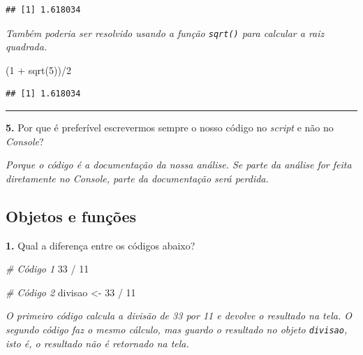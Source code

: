 \documentclass[
]{book}
\newenvironment{Shaded}{\begin{snugshade}}{\end{snugshade}}
\newcommand{\CommentTok}[1]{\textcolor[rgb]{0.56,0.35,0.01}{\textit{#1}}}
\newcommand{\DecValTok}[1]{\textcolor[rgb]{0.00,0.00,0.81}{#1}}
\newcommand{\FunctionTok}[1]{\textcolor[rgb]{0.00,0.00,0.00}{#1}}
\newcommand{\NormalTok}[1]{#1}
\newcommand{\OtherTok}[1]{\textcolor[rgb]{0.56,0.35,0.01}{#1}}
\newcommand{\SpecialCharTok}[1]{\textcolor[rgb]{0.00,0.00,0.00}{#1}}
\begin{document}
\begin{verbatim}
## [1] 1.618034
\end{verbatim}

\emph{Também poderia ser resolvido usando a função \texttt{sqrt()} para calcular a raiz quadrada.}

\begin{Shaded}
\begin{Highlighting}[]
\NormalTok{(}\DecValTok{1} \SpecialCharTok{+} \FunctionTok{sqrt}\NormalTok{(}\DecValTok{5}\NormalTok{))}\SpecialCharTok{/}\DecValTok{2}
\end{Highlighting}
\end{Shaded}

\begin{verbatim}
## [1] 1.618034
\end{verbatim}

\begin{center}\rule{0.5\linewidth}{0.5pt}\end{center}

\textbf{5.} Por que é preferível escrevermos sempre o nosso código no \emph{script} e não no \emph{Console}?

\emph{Porque o código é a documentação da nossa análise. Se parte da análise for feita diretamente no Console, parte da documentação será perdida.}

\hypertarget{objetos-e-funuxe7uxf5es}{%
\subsection*{Objetos e funções}\label{objetos-e-funuxe7uxf5es}}

\textbf{1.} Qual a diferença entre os códigos abaixo?

\begin{Shaded}
\begin{Highlighting}[]
\CommentTok{\# Código 1}
\DecValTok{33} \SpecialCharTok{/} \DecValTok{11}

\CommentTok{\# Código 2}
\NormalTok{divisao }\OtherTok{\textless{}{-}} \DecValTok{33} \SpecialCharTok{/} \DecValTok{11}
\end{Highlighting}
\end{Shaded}

\emph{O primeiro código calcula a divisão de 33 por 11 e devolve o resultado na tela. O segundo código faz o mesmo cálculo, mas guardo o resultado no objeto \texttt{divisao}, isto é, o resultado não é retornado na tela.}
\end{document}
